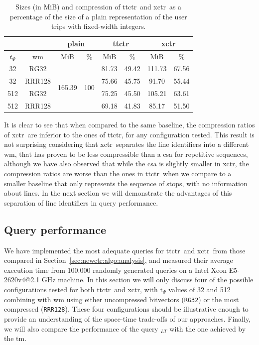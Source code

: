     \begin{table}[ht]
        \centering
        \caption{Sizes (in MiB) and compression of \acrshort{ttctr}~and \acrshort{xctr}~as a percentage of the size of a plain representation of the user trips with fixed-width integers.}
        \label{tab:comp}
        \begin{tabular}{|c|c|c|c|c|c|c|c|}
        \cline{3-8}
        \multicolumn{2}{c}{} & \multicolumn{2}{|c|}{plain} & \multicolumn{2}{|c|}{\gls{ttctr}} & \multicolumn{2}{|c|}{\gls{xctr}} \\
        \hline
        $t_{\Psi}$ & \gls{wm} & MiB & \% & MiB & \% & MiB & \% \\
        \hline
        32 & RG32 & \multirow{4}{*}{165.39} & \multirow{4}{*}{100} & 81.73 & 49.42 & 111.73 & 67.56 \\
        32 & RRR128 & & & 75.66 & 45.75 & 91.70 & 55.44 \\
        512 & RG32 & & & 75.25 & 45.50 & 105.21 & 63.61 \\
        512 & RRR128 & & & 69.18 & 41.83 & 85.17 & 51.50 \\
        \hline
        \end{tabular}
    \end{table}
    
    It is clear to see that when compared to the same baseline, the compression ratios of \gls{xctr}~are inferior to the ones of \gls{ttctr}, for any configuration tested. This result is not surprising considering that \gls{xctr}~separates the line identifiers into a different \gls{wm}, that has proven to be less compressible than a \gls{csa} for repetitive sequences, although we have also observed that while the \gls{csa} is slightly smaller in \gls{xctr}, the compression ratios are worse than the ones in \gls{ttctr}~when we compare to a smaller baseline that only represents the sequence of stops, with no information about lines. In the next section we will demonstrate the advantages of this separation of line identifiers in query performance.
    
    \subsection{Query performance}
    \label{sec:newctr:exp:time}
    We have implemented the most adequate queries for \gls{ttctr}~and \gls{xctr}~from those compared in Section~\ref{sec:newctr:algo:analysis}, and measured their average execution time from 100.000 randomly generated queries on a Intel Xeon E5-2620v4@2.1 GHz machine. In this section we will only discuss four of the possible configurations tested for both \gls{ttctr}~and \gls{xctr}, with t$_{\Psi}$ values of 32 and 512 combining with \gls{wm} using either uncompressed bitvectors (\texttt{RG32}) or the most compressed (\texttt{RRR128}). These four configurations should be illustrative enough to provide an understanding of the space-time trade-offs of our approaches. Finally, we will also compare the performance of the query \boardX$_{LT}$ with the one achieved by the \gls{tm}.
    
